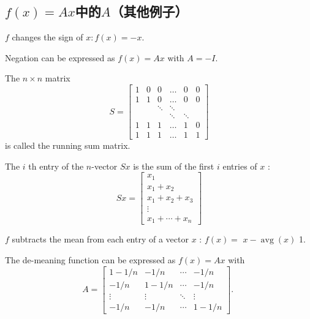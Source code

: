 \subsection{$f(x)=A x$中的$A$（其他例子）}

\begin{example}[Negation]
    $ f $ changes the sign of $ x: f(x)=-x $.

Negation can be expressed as $ f(x)=A x $ with $ A=-I $.
\end{example}

\begin{example}
    The $ n \times n $ matrix
\begin{equation}
S=\left[\begin{array}{cccccc}
1 & 0 & 0 & \ldots & 0 & 0 \\
1 & 1 & 0 & \ldots & 0 & 0 \\
& & \ddots & \ddots & & \\
& & & \ddots & \ddots & \\
1 & 1 & 1 & \ldots & 1 & 0 \\
1 & 1 & 1 & \ldots & 1 & 1
\end{array}\right]
\end{equation}
is called the running sum matrix. 

The $ i $ th entry of the $ n $-vector $ S x $ is the sum of the first $ i $ entries of $ x $ :
\begin{equation}
S x=\left[\begin{array}{c}
x_{1} \\
x_{1}+x_{2} \\
x_{1}+x_{2}+x_{3} \\
\vdots \\
x_{1}+\cdots+x_{n}
\end{array}\right]
\end{equation}
\end{example}

\begin{example}
    $ f $ subtracts the mean from each entry of a vector $ x $ : $ f(x)= $ $ x-\operatorname{avg}(x) $ 1.

The de-meaning function can be expressed as $ f(x)=A x $ with
\begin{equation}
A=\left[\begin{array}{cccc}
1-1 / n & -1 / n & \cdots & -1 / n \\
-1 / n & 1-1 / n & \cdots & -1 / n \\
\vdots & \vdots & \ddots & \vdots \\
-1 / n & -1 / n & \cdots & 1-1 / n
\end{array}\right] \text {. }
\end{equation}
\end{example}

